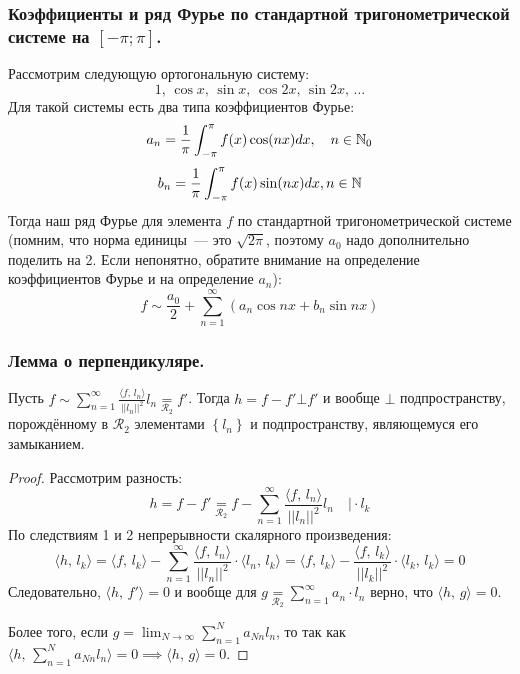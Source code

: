\subsubsection{Коэффициенты и ряд Фурье по стандартной тригонометрической системе на $[-\pi; \pi]$.}
Рассмотрим следующую ортогональную систему:
\[1,\, \cos x,\, \sin x,\, \cos 2x,\, \sin 2x,\, \ldots \]
Для такой системы есть два типа коэффициентов Фурье:
\[a_n = \frac{1}{\pi} \int_{-\pi}^\pi f(x) \cos (nx) dx, \quad n \in \mathbb{N}_0\]
\[b_n = \frac{1}{\pi} \int_{-\pi}^\pi f(x) \sin (nx) dx, n \in \mathbb{N}\]
Тогда наш ряд Фурье для элемента $f$ по стандартной тригонометрической системе (помним, что норма единицы~--- это $\sqrt{2\pi}$, поэтому $a_0$ надо дополнительно поделить на 2. Если непонятно, обратите внимание на определение коэффициентов Фурье и на определение $a_n$):
\[f \sim \frac{a_0}{2} + \sum_{n=1}^\infty \left( a_n \cos nx + b_n \sin nx \right)\]

\subsubsection{Лемма о перпендикуляре.}
\begin{theorem*}
    Пусть $f \sim \sum_{n=1}^\infty \frac{\langle f,\, l_n \rangle}{\lvert \lvert l_n \rvert \rvert^2} l_n \underset{\mathcal{R}_2}{=} f'$. Тогда $h = f - f' \bot f'$ и вообще $\bot$ подпространству, порождённому в $\mathcal{R}_2$ элементами $\left\{ l_n \right\}$ и подпространству, являющемуся его замыканием.
\end{theorem*}
\begin{proof}
    Рассмотрим разность:
    \[h = f - f' \underset{\mathcal{R}_2}{=} f - \sum_{n=1}^\infty \frac{\langle f,\, l_n \rangle}{\lvert \lvert l_n \rvert \rvert^2} l_n \quad \Big| \cdot l_k\]
    По следствиям 1 и 2 непрерывности скалярного произведения:
    \[\langle h,\, l_k \rangle = \langle f,\, l_k \rangle  - \sum_{n=1}^\infty \frac{\langle f,\, l_n \rangle}{\lvert \lvert l_n \rvert \rvert^2} \cdot \langle l_n,\, l_k \rangle = \langle f,\, l_k \rangle - \frac{\langle f ,\, l_k \rangle}{\lvert \lvert l_k \rvert \rvert^2} \cdot \langle l_k,\, l_k \rangle = 0\]
    Следовательно, $\langle h,\, f' \rangle = 0$ и вообще для $g \underset{\mathcal{R}_2}{=} \sum_{n=1}^\infty a_n \cdot l_n$ верно, что $\langle h,\, g \rangle = 0$.

    Более того, если $g = \lim_{N \to \infty} \sum_{n = 1}^N a_{Nn} l_n$, то так как $\langle h,\, \sum_{n=1}^N a_{Nn} l_n \rangle = 0 \implies \langle h,\, g \rangle = 0$.
\end{proof}

